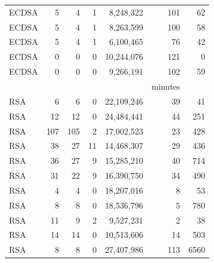 \begin{table}[]
\begin{threeparttable}
\begin{tabular}{l@{}r@{~~}rrr@{~~}rr}
      ECDSA\tnote{5}              &  5                    & 4                   & 1                    &  8,248,322       & 101     & 62           \\   
      ECDSA\tnote{6}              &  5                    & 4                   & 1                    &  8,263,599      & 100     & 58            \\   
      ECDSA\tnote{7}              &  5                    & 4                   & 1                    &  6,100,465       & 76      & 42                  \\  
      ECDSA\tnote{8}              & 0                      &  0                   &    0               &  10,244,076       &  121     & 0                  \\  
      ECDSA\tnote{9}              & 0                      &  0                   &  0                 &  9,266,191          & 102     & 59        \\  


                         &                        &                     &                      &                 & minutes            \\
      RSA\tnote{1}                & 6                       & 6                   & 0                    & 22,109,246    & 39     & 41           \\
      RSA\tnote{2}                & 12                      & 12                  & 0                    & 24,484,441    & 44     & 251           \\
      RSA\tnote{4}                & 107                    & 105                 & 2                    & 17,002,523   & 23      & 428           \\
      RSA\tnote{5}                & 38                     & 27                  & 11                   & 14,468,307   & 29     & 436          \\
      RSA\tnote{6}                & 36                     & 27                  & 9                    & 15,285,210   & 40     & 714          \\
      RSA\tnote{7}                & 31                     & 22                  & 9                    & 16,390,750   & 34      & 490         \\
      RSA\tnote{8}                & 4                      &  4                  & 0                    & 18,207,016   & 8      & 53          \\
      RSA\tnote{9}                & 8                      &  8                  & 0                    & 18,536,796    & 5      & 780         \\
      RSA\tnote{10} & 11& 9& 2& 9,527,231& 2 &38\\
      RSA\tnote{11} & 14& 14& 0& 10,513,606& 14 &503 \\
      RSA\tnote{12}               & 8                      &  8                  & 0                    & 27,407,986    & 113    & 6560       \\


\end{tabular}
\end{threeparttable}
\end{table}

